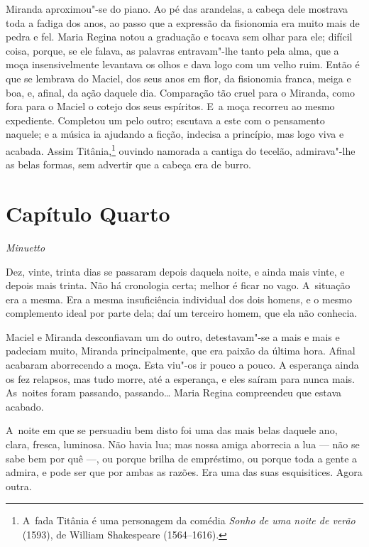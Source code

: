 \begin{linenumbers}
Miranda aproximou"-se do piano. Ao pé das arandelas, a cabeça dele
mostrava toda a fadiga dos anos, ao passo que a expressão da fisionomia
era muito mais de pedra e fel. Maria Regina notou a graduação e tocava
sem olhar para ele; difícil coisa, porque, se ele falava, as palavras
entravam"-lhe tanto pela alma, que a moça insensivelmente levantava os
olhos e dava logo com um velho ruim. Então é que se lembrava do Maciel,
dos seus anos em flor, da fisionomia franca, meiga e boa, e, afinal, da
ação daquele dia. Comparação tão cruel para o Miranda, como fora para o
Maciel o cotejo dos seus espíritos. E~a moça recorreu ao mesmo
expediente. Completou um pelo outro; escutava a este com o pensamento
naquele; e a música ia ajudando a ficção, indecisa a princípio, mas logo
viva e acabada. Assim Titânia,\footnote{A~fada Titânia é uma personagem
  da comédia \emph{Sonho de uma noite de verão} (1593), de William
  Shakespeare (1564--1616).} ouvindo namorada a cantiga do tecelão,
admirava"-lhe as belas formas, sem advertir que a cabeça era de burro.

\section{Capítulo Quarto}

\emph{Minuetto}

Dez, vinte, trinta dias se passaram depois daquela noite, e ainda mais
vinte, e depois mais trinta. Não há cronologia certa; melhor é ficar no
vago. A~situação era a mesma. Era a mesma insuficiência individual dos
dois homens, e o mesmo complemento ideal por parte dela; daí um terceiro
homem, que ela não conhecia.

Maciel e Miranda desconfiavam um do outro, detestavam"-se a mais e mais e
padeciam muito, Miranda principalmente, que era paixão da última hora.
Afinal acabaram aborrecendo a moça. Esta viu"-os ir pouco a pouco. A
esperança ainda os fez relapsos, mas tudo morre, até a esperança, e eles
saíram para nunca mais. As~noites foram passando, passando\ldots{} Maria
Regina compreendeu que estava acabado.

A~noite em que se persuadiu bem disto foi uma das mais belas daquele
ano, clara, fresca, luminosa. Não havia lua; mas nossa amiga aborrecia a
lua --- não se sabe bem por quê ---, ou porque brilha de empréstimo, ou
porque toda a gente a admira, e pode ser que por ambas as razões. Era
uma das suas esquisitices. Agora outra.


\end{linenumbers}
